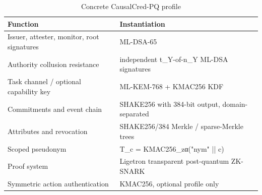 \begin{table}[t]
\centering
\caption{Concrete CausalCred-PQ profile}
\begin{tabular}{ll}
\hline
Function & Instantiation \\
\hline
Issuer, attester, monitor, root signatures & ML-DSA-65 \\
Authority collusion resistance & independent t\_Y-of-n\_Y ML-DSA signatures \\
Task channel / optional capability key & ML-KEM-768 + KMAC256 KDF \\
Commitments and event chain & SHAKE256 with 384-bit output, domain-separated \\
Attributes and revocation & SHAKE256/384 Merkle / sparse-Merkle trees \\
Scoped pseudonym & T\_c = KMAC256\_zα("nym" || c) \\
Proof system & Ligetron transparent post-quantum ZK-SNARK \\
Symmetric action authentication & KMAC256, optional profile only \\
\hline
\end{tabular}
\end{table}
